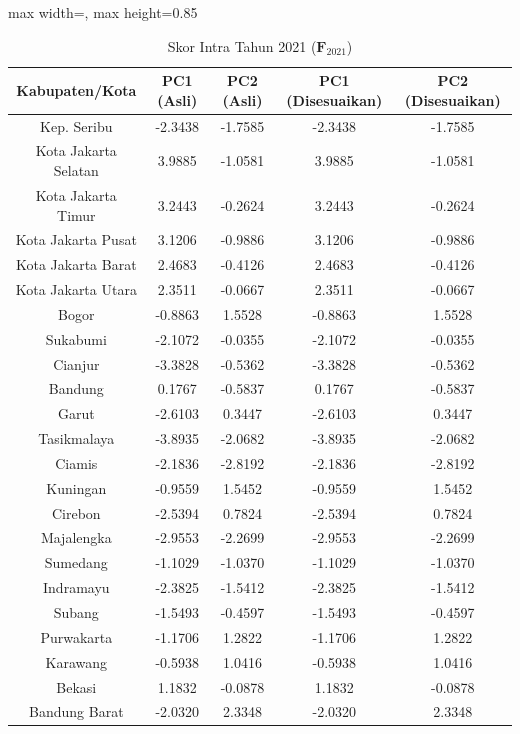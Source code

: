 \begin{table}[H]
\centering
\caption{Skor Intra Tahun 2021 ($\mathbf{F}_{2021}$)} \label{tab:app1skor_intra_2021}
\begin{adjustbox}{max width=\textwidth, max height=0.85\textheight}
\begin{tabular}{|c|c|c|c|c|}
\hline
\textbf{Kabupaten/Kota} & \textbf{PC1 (Asli)} & \textbf{PC2 (Asli)} & \textbf{PC1 (Disesuaikan)} & \textbf{PC2 (Disesuaikan)} \\
\hline
Kep. Seribu & -2.3438 & -1.7585 & -2.3438 & -1.7585 \\
Kota Jakarta Selatan & 3.9885 & -1.0581 & 3.9885 & -1.0581 \\
Kota Jakarta Timur & 3.2443 & -0.2624 & 3.2443 & -0.2624 \\
Kota Jakarta Pusat & 3.1206 & -0.9886 & 3.1206 & -0.9886 \\
Kota Jakarta Barat & 2.4683 & -0.4126 & 2.4683 & -0.4126 \\
Kota Jakarta Utara & 2.3511 & -0.0667 & 2.3511 & -0.0667 \\
Bogor & -0.8863 & 1.5528 & -0.8863 & 1.5528 \\
Sukabumi & -2.1072 & -0.0355 & -2.1072 & -0.0355 \\
Cianjur & -3.3828 & -0.5362 & -3.3828 & -0.5362 \\
Bandung & 0.1767 & -0.5837 & 0.1767 & -0.5837 \\
Garut & -2.6103 & 0.3447 & -2.6103 & 0.3447 \\
Tasikmalaya & -3.8935 & -2.0682 & -3.8935 & -2.0682 \\
Ciamis & -2.1836 & -2.8192 & -2.1836 & -2.8192 \\
Kuningan & -0.9559 & 1.5452 & -0.9559 & 1.5452 \\
Cirebon & -2.5394 & 0.7824 & -2.5394 & 0.7824 \\
Majalengka & -2.9553 & -2.2699 & -2.9553 & -2.2699 \\
Sumedang & -1.1029 & -1.0370 & -1.1029 & -1.0370 \\
Indramayu & -2.3825 & -1.5412 & -2.3825 & -1.5412 \\
Subang & -1.5493 & -0.4597 & -1.5493 & -0.4597 \\
Purwakarta & -1.1706 & 1.2822 & -1.1706 & 1.2822 \\
Karawang & -0.5938 & 1.0416 & -0.5938 & 1.0416 \\
Bekasi & 1.1832 & -0.0878 & 1.1832 & -0.0878 \\
Bandung Barat & -2.0320 & 2.3348 & -2.0320 & 2.3348 \\

\end{tabular}
\end{adjustbox}
\end{table}
